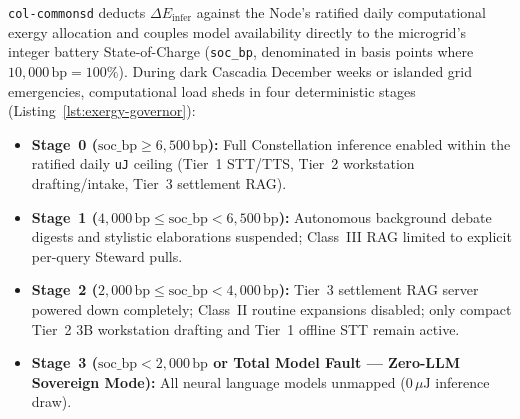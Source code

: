 \texttt{col-commonsd} deducts $\Delta E_{\mathrm{infer}}$ against the Node's ratified daily computational exergy allocation and couples model availability directly to the microgrid's integer battery State-of-Charge (\texttt{soc\_bp}, denominated in basis points where $10{,}000\,\mathrm{bp} = 100\%$). During dark Cascadia December weeks or islanded grid emergencies, computational load sheds in four deterministic stages (Listing~\ref{lst:exergy-governor}):
\begin{itemize}
  \item \textbf{Stage~0 ($\mathrm{soc\_bp} \ge 6{,}500\,\mathrm{bp}$):} Full Constellation inference enabled within the ratified daily \texttt{uJ} ceiling (Tier~1 STT/TTS, Tier~2 workstation drafting/intake, Tier~3 settlement RAG).
  \item \textbf{Stage~1 ($4{,}000\,\mathrm{bp} \le \mathrm{soc\_bp} < 6{,}500\,\mathrm{bp}$):} Autonomous background debate digests and stylistic elaborations suspended; Class~III RAG limited to explicit per-query Steward pulls.
  \item \textbf{Stage~2 ($2{,}000\,\mathrm{bp} \le \mathrm{soc\_bp} < 4{,}000\,\mathrm{bp}$):} Tier~3 settlement RAG server powered down completely; Class~II routine expansions disabled; only compact Tier~2 3B workstation drafting and Tier~1 offline STT remain active.
  \item \textbf{Stage~3 ($\mathrm{soc\_bp} < 2{,}000\,\mathrm{bp}$ or Total Model Fault --- Zero-LLM Sovereign Mode):} All neural language models unmapped ($0\,\mu\mathrm{J}$ inference draw).
\end{itemize}


